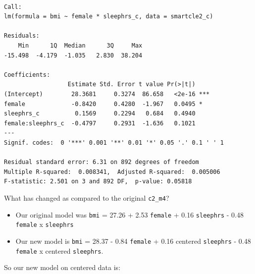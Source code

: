 \documentclass[]{book}
\newenvironment{Shaded}{\begin{snugshade}}{\end{snugshade}}
\newcommand{\KeywordTok}[1]{\textcolor[rgb]{0.13,0.29,0.53}{\textbf{#1}}}
\newcommand{\DataTypeTok}[1]{\textcolor[rgb]{0.13,0.29,0.53}{#1}}
\newcommand{\StringTok}[1]{\textcolor[rgb]{0.31,0.60,0.02}{#1}}
\newcommand{\OperatorTok}[1]{\textcolor[rgb]{0.81,0.36,0.00}{\textbf{#1}}}
\newcommand{\NormalTok}[1]{#1}
\providecommand{\tightlist}{%
  \setlength{\itemsep}{0pt}\setlength{\parskip}{0pt}}
\theoremstyle{definition}
\theoremstyle{definition}
\theoremstyle{definition}
\theoremstyle{remark}
\begin{document}
\begin{Shaded}
\end{Shaded}

\begin{verbatim}

Call:
lm(formula = bmi ~ female * sleephrs_c, data = smartcle2_c)

Residuals:
    Min      1Q  Median      3Q     Max 
-15.498  -4.179  -1.035   2.830  38.204 

Coefficients:
                  Estimate Std. Error t value Pr(>|t|)    
(Intercept)        28.3681     0.3274  86.658   <2e-16 ***
female             -0.8420     0.4280  -1.967   0.0495 *  
sleephrs_c          0.1569     0.2294   0.684   0.4940    
female:sleephrs_c  -0.4797     0.2931  -1.636   0.1021    
---
Signif. codes:  0 '***' 0.001 '**' 0.01 '*' 0.05 '.' 0.1 ' ' 1

Residual standard error: 6.31 on 892 degrees of freedom
Multiple R-squared:  0.008341,  Adjusted R-squared:  0.005006 
F-statistic: 2.501 on 3 and 892 DF,  p-value: 0.05818
\end{verbatim}

What has changed as compared to the original \texttt{c2\_m4}?

\begin{itemize}
\tightlist
\item
  Our original model was \texttt{bmi} = 27.26 + 2.53 \texttt{female} +
  0.16 \texttt{sleephrs} - 0.48 \texttt{female} x \texttt{sleephrs}
\item
  Our new model is \texttt{bmi} = 28.37 - 0.84 \texttt{female} + 0.16
  centered \texttt{sleephrs} - 0.48 \texttt{female} x centered
  \texttt{sleephrs}.
\end{itemize}

So our new model on centered data is:
\end{document}
